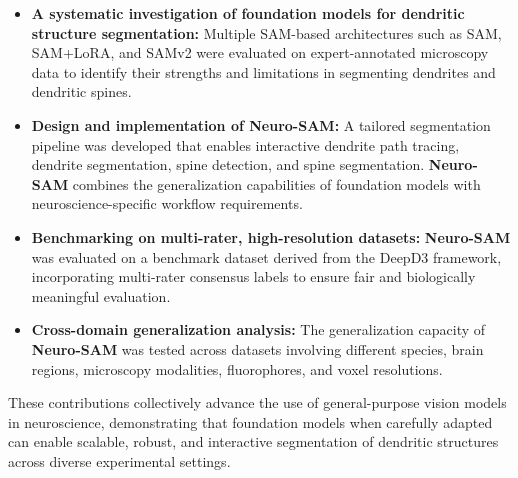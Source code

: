 \begin{itemize}
\item \textbf{A systematic investigation of foundation models for dendritic structure segmentation:} Multiple \gls{SAM}-based architectures such as \gls{SAM}, \gls{SAM}+\gls{LoRA}, and \gls{SAMv2} were evaluated on expert-annotated microscopy data to identify their strengths and limitations in segmenting dendrites and dendritic spines.

\item \textbf{Design and implementation of \textbf{Neuro-\gls{SAM}}:} A tailored segmentation pipeline was developed that enables interactive dendrite path tracing, dendrite segmentation, spine detection, and spine segmentation. \textbf{Neuro-\gls{SAM}} combines the generalization capabilities of foundation models with neuroscience-specific workflow requirements.

\item \textbf{Benchmarking on multi-rater, high-resolution datasets:} \textbf{Neuro-\gls{SAM}} was evaluated on a benchmark dataset derived from the \gls{DeepD3} framework, incorporating multi-rater consensus labels to ensure fair and biologically meaningful evaluation.

\item \textbf{Cross-domain generalization analysis:} The generalization capacity of \textbf{Neuro-\gls{SAM}} was tested across datasets involving different species, brain regions, microscopy modalities, fluorophores, and voxel resolutions.

\end{itemize}

These contributions collectively advance the use of general-purpose vision models in neuroscience, demonstrating that foundation models when carefully adapted can enable scalable, robust, and interactive segmentation of dendritic structures across diverse experimental settings.







